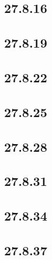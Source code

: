 \documentclass{article}
\begin{document}
\subsection{27.8.16}

\subsection{27.8.19}

\subsection{27.8.22}

\subsection{27.8.25}

\subsection{27.8.28}

\subsection{27.8.31}

\subsection{27.8.34}

\subsection{27.8.37}
\end{document}

